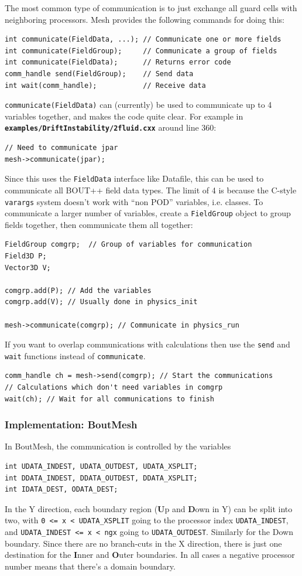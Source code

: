 \documentclass[12pt]{article}
\newcommand{\code}[1]{\texttt{#1}}
\newcommand{\file}[1]{\texttt{\bf #1}}
\begin{document}
The most common type of communication is to just exchange all
guard cells with neighboring processors. Mesh provides the following
commands for doing this:
\begin{lstlisting}
int communicate(FieldData, ...); // Communicate one or more fields
int communicate(FieldGroup);     // Communicate a group of fields
int communicate(FieldData);      // Returns error code
comm_handle send(FieldGroup);    // Send data
int wait(comm_handle);           // Receive data
\end{lstlisting}
\code{communicate(FieldData)} can (currently) be used to communicate
up to 4 variables together, and makes the code quite clear. For example in
\file{examples/DriftInstability/2fluid.cxx} around line 360:
\begin{lstlisting}
// Need to communicate jpar
mesh->communicate(jpar);
\end{lstlisting}
Since this uses the \code{FieldData} interface like Datafile, this can
be used to communicate all BOUT++ field data types. The limit of 4 is
because the C-style \code{varargs} system doesn't work with ``non POD''
variables, i.e. classes. To communicate a larger number of variables,
create a \code{FieldGroup} object to group fields together, then communicate
them all together:
\begin{lstlisting}
FieldGroup comgrp;  // Group of variables for communication
Field3D P;
Vector3D V;

comgrp.add(P); // Add the variables
comgrp.add(V); // Usually done in physics_init

mesh->communicate(comgrp); // Communicate in physics_run
\end{lstlisting}

If you want to overlap communications with calculations then
use the \code{send} and \code{wait} functions instead of \code{communicate}.
\begin{lstlisting}
comm_handle ch = mesh->send(comgrp); // Start the communications
// Calculations which don't need variables in comgrp
wait(ch); // Wait for all communications to finish
\end{lstlisting}

\subsubsection{Implementation: BoutMesh}

In BoutMesh, the communication is controlled by the variables
\begin{lstlisting}
int UDATA_INDEST, UDATA_OUTDEST, UDATA_XSPLIT;
int DDATA_INDEST, DDATA_OUTDEST, DDATA_XSPLIT;
int IDATA_DEST, ODATA_DEST;
\end{lstlisting}
In the Y direction, each boundary region ({\bf U}p and {\bf D}own in Y) 
can be split into two, with \code{0 <= x < UDATA\_XSPLIT} going to
the processor index \code{UDATA\_INDEST}, and \code{UDATA\_INDEST <= x < ngx}
going to \code{UDATA\_OUTDEST}. Similarly for the Down boundary.
Since there are no branch-cuts in the X direction, there is just one
destination for the {\bf I}nner and {\bf O}uter boundaries.
In all cases a negative processor number means that there's a domain boundary.
\end{document}
